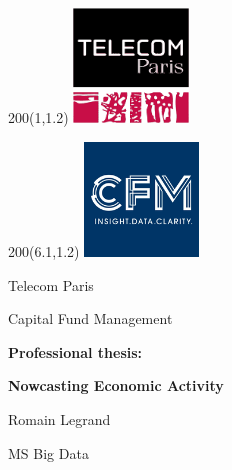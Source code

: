 \begin{titlepage}
	
	\begin{textblock}{200}(1,1.2)
		{\includegraphics[width=1.2in, height=1.2in]{images/logotelecom.png}}
	\end{textblock}
		
	\begin{textblock}{200}(6.1,1.2)
		{\includegraphics[width=1.2in, height=1.2in]{images/logocfm.png}}
	\end{textblock}

	\vspace*{45mm}
	
	\begin{center}
		
		{\fontsize{18}{26}\selectfont Telecom Paris} \vspace{5mm}
		
		{\fontsize{18}{26}\selectfont Capital Fund Management} \vspace{10mm}

		\begin{titlepagebox}
			
			\begin{center}
				\textbf{{\fontsize{24}{26}\selectfont Professional thesis:}}
				
				\textbf{{\fontsize{24}{26}\selectfont Nowcasting Economic Activity}}	
			\end{center}
				
		\end{titlepagebox} \vspace{10mm}
	
	
		{\fontsize{18}{26}\selectfont Romain Legrand} \vspace{2mm}
		
		{\fontsize{18}{26}\selectfont MS Big Data} \vspace{2mm}
		

\end{center}
\end{titlepage}
